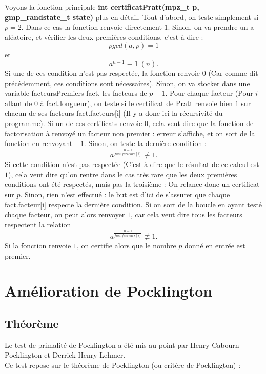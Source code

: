 \documentclass[a4paper]{article}
\begin{document}
Voyons la fonction principale \textbf{int certificatPratt(mpz\_t p, \\
gmp\_randstate\_t state)} plus en détail. Tout d'abord, on teste simplement
si $p=2$. Dans ce cas la fonction renvoie directement $1$.
Sinon, on va prendre un a aléatoire, et vérifier les deux premières conditions,
c'est à dire :
$$
pgcd(a,p)=1
$$
et
$$
a^{n-1} \equiv 1 \ (n).
$$
Si une de ces condition n'est pas respectée, la fonction renvoie $0$ (Car
comme dit précédemment, ces conditions sont nécessaires).
Sinon, on va stocker dans une variable facteursPremiers fact, les facteurs
de $p-1$. Pour chaque facteur (Pour $i$ allant de $0$ à fact.longueur), on
teste si le certificat de Pratt renvoie bien $1$ sur chacun de ses facteurs
fact.facteurs[i] (Il y a donc ici la récursivité du programme). Si un de ces
certificats renvoie $0$, cela veut dire que la fonction de factorisation à
renvoyé un facteur non premier : erreur s'affiche, et on sort de la fonction
en renvoyant $-1$. Sinon, on teste la dernière condition : 
$$
a^\frac{n-1}{fact.facteurs[i]}\not\equiv 1.
$$
Si cette condition n'est pas respectée (C'est à dire que le résultat de ce
calcul est $1$), cela veut dire qu'on rentre dans le cas très rare que les
deux premières conditions ont été respectés, mais pas la troisième : On relance
donc un certificat sur $p$. Sinon, rien n'est effectué : le but est d'ici de
s'assurer que chaque fact.facteur[i] respecte la dernière condition.
Si on sort de la boucle en ayant testé chaque facteur, on peut alors renvoyer
$1$, car cela veut dire tous les facteurs respectent la relation 
$$
a^\frac{n-1}{fact.facteurs[i]}\not\equiv 1.
$$
Si la fonction renvoie $1$, on certifie alors que le nombre $p$ donné en
entrée est premier.

\newpage

\section{Amélioration de Pocklington}

\subsection{Théorème}

Le test de primalité de Pocklington a été mis au point par Henry Cabourn
Pocklington et Derrick Henry Lehmer.\\

Ce test repose sur le théorème de Pocklington (ou critère de Pocklington) :
\end{document}
